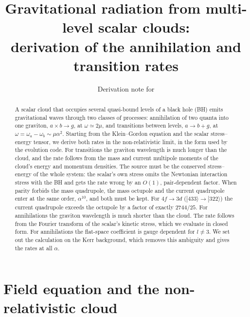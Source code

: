 \documentclass[11pt]{article}
\title{Gravitational radiation from multi-level scalar clouds:\\ derivation of the annihilation and transition rates}
\author{Derivation note for \code{src/Numerics/gw_rates.jl}}
\date{}
\begin{document}
\maketitle

\begin{abstract}
A scalar cloud that occupies several quasi-bound levels of a black hole (BH) emits gravitational waves through two classes of processes: annihilation of two quanta into one graviton, $a\times b\to g$, at $\omega\simeq2\mu$, and transitions between levels, $a\to b+g$, at $\omega=\omega_a-\omega_b\sim\mu\alpha^2$. Starting from the Klein--Gordon equation and the scalar stress--energy tensor, we derive both rates in the non-relativistic limit, in the form used by the evolution code. For transitions the graviton wavelength is much longer than the cloud, and the rate follows from the mass and current multipole moments of the cloud's energy and momentum densities. The source must be the conserved stress--energy of the whole system: the scalar's own stress omits the Newtonian interaction stress with the BH and gets the rate wrong by an $O(1)$, pair-dependent factor. When parity forbids the mass quadrupole, the mass octupole and the current quadrupole enter at the same order, $\alpha^{10}$, and both must be kept. For $4f\to3d$ ($|433\rangle\to|322\rangle$) the current quadrupole exceeds the octupole by a factor of exactly $2744/25$. For annihilations the graviton wavelength is much shorter than the cloud. The rate follows from the Fourier transform of the scalar's kinetic stress, which we evaluate in closed form. For annihilations the flat-space coefficient is gauge dependent for $l\neq3$. We set out the calculation on the Kerr background, which removes this ambiguity and gives the rates at all $\alpha$.
\end{abstract}

\section{Field equation and the non-relativistic cloud}
\label{sec:field}
\end{document}
